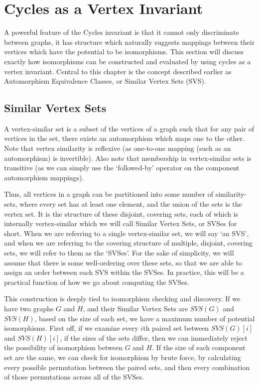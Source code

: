 \chapter{Cycles as a Vertex Invariant}

A powerful feature of the Cycles invariant is that it cannot only discriminate between graphs, it has structure which naturally suggests mappings between their vertices which have the potential to be isomorphisms.
This section will discuss exactly how isomorphisms can be constructed and evaluated by using cycles as a vertex invariant.
Central to this chapter is the concept described earlier as Automorphism Equivalence Classes, or Similar Vertex Sets (SVS).

\section{Similar Vertex Sets}
\label{section:qsvsesdef1}

A vertex-similar set is a subset of the vertices of a graph such that for any pair of vertices in the set, there exists an automorphism which maps one to the other.
Note that vertex similarity is reflexive (as one-to-one mapping (such as an automorphism) is invertible). 
Also note that membership in vertex-similar sets is transitive (as we can simply use the `followed-by' operator on the component automorphism mappings).

Thus, all vertices in a graph can be partitioned into some number of similarity-sets, where every set has at least one element, and the union of the sets is the vertex set.
It is the structure of these disjoint, covering sets, each of which is internally vertex-similar which we will call Similar Vertex Sets, or SVSes for short.
When we are referring to a single vertex-similar set, we will say `an SVS', and when we are referring to the covering structure of multiple, disjoint, covering sets, we will refer to them as the `SVSes'.
For the sake of simplicity, we will assume that there is some well-ordering over these sets, so that we are able to assign an order between each SVS within the SVSes.
In practice, this will be a practical function of how we go about computing the SVSes.

This construction is deeply tied to isomorphism checking and discovery.
If we have two graphs $G$ and $H$, and their Similar Vertex Sets are $SVS(G)$ and $SVS(H)$, based on the size of each set, we have a maximum number of potential isomorphisms.
First off, if we examine every $i$th paired set between $SVS(G)[i]$ and  $SVS(H)[i]$, if the sizes of the sets differ, then we can immediately reject the possibility of isomorphism between $G$ and $H$.
If the size of each component set are the same, we can check for isomorphism by brute force, by calculating every possible permutation between the paired sets, and then every combination of those permutations across all of the SVSes.

